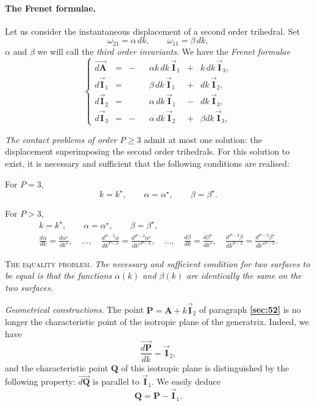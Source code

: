 \documentclass[leqno,11pt]{book}
\numberwithin{equation}{chapter}
\theoremstyle{shape1}
\theoremstyle{shapesmall}
\newcommand{\fsref}[1]{{\rm\textsection\textbf{\ref{sec:#1}}}}
\newcommand{\str}{^{\star}}
\newcommand{\rvec}[1]{\vec{\mathbf{#1}}}
\newcommand{\ivec}{\rvec{I}}
\newcommand{\somespace}{\vspace{9pt}}
\begin{document}
\paragraph{The Frenet formulae.}
\label{sec:57}
Let us consider the instantaneous displacement of a second order trihedral. Set
\[
\omega_{21}=\alpha\,dk,\qquad\omega_{11}=\beta\,dk,
\]
$\alpha$ and $\beta$ we will call the \emph{third order invariants}. We have the \emph{Frenet formulae}
\begin{equation}
  \label{eq:4.13}
  \left\{
    \begin{alignedat}{6}
      \overrightarrow{d\mathbf{A}}&={}&-{}&&\alpha k\,dk\,\ivec_{1}&+{}&k\,dk\,\ivec_{3},\\
      d\ivec_{1}&=&&&\beta\,dk\,\ivec_{1}&{}+{}&dk\,\ivec_{2},\\
      d\ivec_{2}&=&&&\alpha\,dk\,\ivec_{1}&{}-{}&dk\,\ivec_{3},\\
      d\ivec_{3}&=&-&&\alpha\,dk\,\ivec_{2}&{}+{}&\beta dk\,\ivec_{3},      
    \end{alignedat}
  \right.
\end{equation}

\emph{The contact problems of order $P\ge 3$} admit at most one solution: the displacement superimposing the second order trihedrals. For this solution to exist, it is necessary and sufficient that the following conditions are realised:

For $P=3$, 
\[
k=k\str,\qquad \alpha=\alpha\str,\qquad\beta=\beta\str.
\]

For $P>3$,
\begin{gather*}
  k=k\str,\qquad \alpha=\alpha\str,\qquad\beta=\beta\str,\\
  \frac{d\alpha}{dk}=\frac{d\alpha\str}{dk\str},\quad\dots,\quad\frac{d^{P-3}\alpha}{dk^{P-3}}=\frac{d^{P-3}\alpha\str}{dk^{\star P-3}},\quad\dots,\quad\frac{d\beta}{dk}=\frac{d\beta\str}{dk\str},\quad\frac{d^{P-3}\beta}{dk^{P-3}}=\frac{d^{P-3}\beta\str}{dk^{\star P-3}}.
\end{gather*}

\somespace

\textsc{The equality problem.} \emph{The necessary and sufficient condition for two surfaces to be equal is that the functions $\alpha(k)$ and $\beta(k)$ are identically the same on the two surfaces.}

\somespace

\emph{Geometrical constructions}. The point $\mathbf{P}=\mathbf{A}+k\ivec_{2}$ of paragraph \fsref{52} is no longer the characteristic point of the isotropic plane of the generatrix. Indeed, we have
\[
\frac{\overrightarrow{d\mathbf{P}}}{dk}=\ivec_{2},
\]
and the characteristic point $\mathbf{Q}$ of this isotropic plane is distinguished by the following property: $\overrightarrow{d\mathbf{Q}}$ is parallel to $\ivec_{1}$. We easily deduce
\[
\mathbf{Q}=\mathbf{P}-\ivec_{1}.
\]
\end{document}
